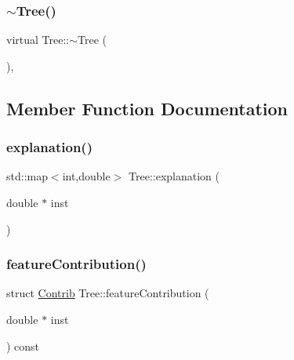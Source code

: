\mbox{\label{classTree_aed209ec340bcf7a378d178e9b41efe44}} 
\subsubsection{\texorpdfstring{$\sim$\+Tree()}{~Tree()}}
{\footnotesize\ttfamily virtual Tree\+::$\sim$\+Tree (\begin{DoxyParamCaption}{ }\end{DoxyParamCaption})\hspace{0.3cm}{\ttfamily [virtual]}, {\ttfamily [default]}}



\subsection{Member Function Documentation}
\mbox{\label{classTree_a435fa1c641f2abe5e26d36507ba02555}} 
\subsubsection{\texorpdfstring{explanation()}{explanation()}}
{\footnotesize\ttfamily std\+::map$<$int,double$>$ Tree\+::explanation (\begin{DoxyParamCaption}\item[{double $\ast$}]{inst }\end{DoxyParamCaption})\hspace{0.3cm}{\ttfamily [inline]}}

\mbox{\label{classTree_a9f3265f93db0eb30a42435d00e26365d}} 
\subsubsection{\texorpdfstring{feature\+Contribution()}{featureContribution()}}
{\footnotesize\ttfamily struct \hyperlink{structContrib}{Contrib} Tree\+::feature\+Contribution (\begin{DoxyParamCaption}\item[{double $\ast$}]{inst }\end{DoxyParamCaption}) const}

